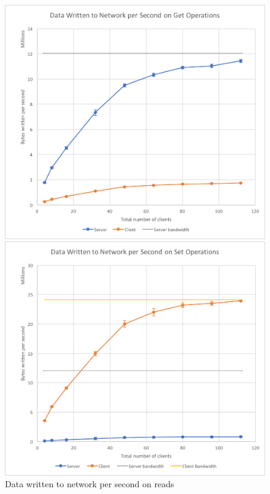 \documentclass[11pt,a4paper]{article}
\begin{document}
\begin{figure}[!h]
    \centering
    \begin{minipage}[b]{.45\textwidth}
        \centering
        \includegraphics[width=\textwidth]{processing/graphics/bench_clients_net_reads.png}
        \caption{Data written to network per second on reads}
        \label{png::bench_clients_net_reads}
    \end{minipage}
    \qquad
    \begin{minipage}[b]{.45\textwidth}
        \centering
        \includegraphics[width=\textwidth]{processing/graphics/bench_clients_net_writes.png}

\end{minipage}
\end{figure}
\end{document}
